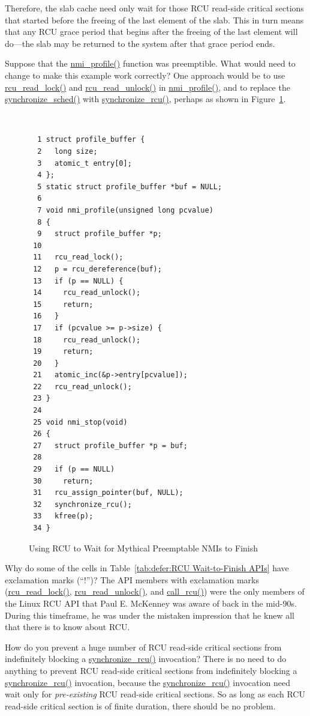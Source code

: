 	Therefore, the slab cache need only wait for those RCU read-side
	critical sections that started before the freeing of the last element
	of the slab.
	This in turn means that any RCU grace period that begins after
	the freeing of the last element will do---the slab may be returned
	to the system after that grace period ends.

\QuickQ{}
	Suppose that the \url{nmi_profile()} function was preemptible.
	What would need to change to make this example work correctly?
\QuickA{}
	One approach would be to use
	\url{rcu_read_lock()} and \url{rcu_read_unlock()}
	in \url{nmi_profile()}, and to replace the
	\url{synchronize_sched()} with \url{synchronize_rcu()},
	perhaps as shown in
	Figure~\ref{fig:defer:Using RCU to Wait for Mythical Preemptable NMIs to Finish}.

\begin{figure}[tbp]
{ \tt \scriptsize
\begin{verbatim}
  1 struct profile_buffer {
  2   long size;
  3   atomic_t entry[0];
  4 };
  5 static struct profile_buffer *buf = NULL;
  6
  7 void nmi_profile(unsigned long pcvalue)
  8 {
  9   struct profile_buffer *p;
 10
 11   rcu_read_lock();
 12   p = rcu_dereference(buf);
 13   if (p == NULL) {
 14     rcu_read_unlock();
 15     return;
 16   }
 17   if (pcvalue >= p->size) {
 18     rcu_read_unlock();
 19     return;
 20   }
 21   atomic_inc(&p->entry[pcvalue]);
 22   rcu_read_unlock();
 23 }
 24
 25 void nmi_stop(void)
 26 {
 27   struct profile_buffer *p = buf;
 28
 29   if (p == NULL)
 30     return;
 31   rcu_assign_pointer(buf, NULL);
 32   synchronize_rcu();
 33   kfree(p);
 34 }
\end{verbatim}
}
\caption{Using RCU to Wait for Mythical Preemptable NMIs to Finish}
\label{fig:defer:Using RCU to Wait for Mythical Preemptable NMIs to Finish}
\end{figure}


\QuickQ{}
	Why do some of the cells in
	Table~\ref{tab:defer:RCU Wait-to-Finish APIs}
	have exclamation marks (``!'')?
\QuickA{}
	The API members with exclamation marks (\url{rcu_read_lock()},
	\url{rcu_read_unlock()}, and \url{call_rcu()}) were the
	only members of the Linux RCU API that Paul E. McKenney was aware
	of back in the mid-90s.
	During this timeframe, he was under the mistaken impression that
	he knew all that there is to know about RCU.

\QuickQ{}
	How do you prevent a huge number of RCU read-side critical
	sections from indefinitely blocking a \url{synchronize_rcu()}
	invocation?
\QuickA{}
	There is no need to do anything to prevent RCU read-side
	critical sections from indefinitely blocking a
	\url{synchronize_rcu()} invocation, because the
	\url{synchronize_rcu()} invocation need wait only for
	\emph{pre-existing} RCU read-side critical sections.
	So as long as each RCU read-side critical section is
	of finite duration, there should be no problem.

